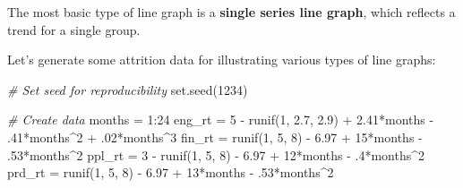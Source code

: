 \documentclass[
]{book}
\newenvironment{Shaded}{\begin{snugshade}}{\end{snugshade}}
\newcommand{\CommentTok}[1]{\textcolor[rgb]{0.56,0.35,0.01}{\textit{#1}}}
\newcommand{\DecValTok}[1]{\textcolor[rgb]{0.00,0.00,0.81}{#1}}
\newcommand{\FloatTok}[1]{\textcolor[rgb]{0.00,0.00,0.81}{#1}}
\newcommand{\FunctionTok}[1]{\textcolor[rgb]{0.00,0.00,0.00}{#1}}
\newcommand{\NormalTok}[1]{#1}
\newcommand{\OtherTok}[1]{\textcolor[rgb]{0.56,0.35,0.01}{#1}}
\newcommand{\SpecialCharTok}[1]{\textcolor[rgb]{0.00,0.00,0.00}{#1}}
\begin{document}
The most basic type of line graph is a \textbf{single series line graph}, which reflects a trend for a single group.

Let's generate some attrition data for illustrating various types of line graphs:

\begin{Shaded}
\begin{Highlighting}[]
\CommentTok{\# Set seed for reproducibility}
\FunctionTok{set.seed}\NormalTok{(}\DecValTok{1234}\NormalTok{)}

\CommentTok{\# Create data}
\NormalTok{months }\OtherTok{=} \DecValTok{1}\SpecialCharTok{:}\DecValTok{24}
\NormalTok{eng\_rt }\OtherTok{=} \DecValTok{5} \SpecialCharTok{{-}} \FunctionTok{runif}\NormalTok{(}\DecValTok{1}\NormalTok{, }\FloatTok{2.7}\NormalTok{, }\FloatTok{2.9}\NormalTok{) }\SpecialCharTok{+} \FloatTok{2.41}\SpecialCharTok{*}\NormalTok{months }\SpecialCharTok{{-}}\NormalTok{ .}\DecValTok{41}\SpecialCharTok{*}\NormalTok{months}\SpecialCharTok{\^{}}\DecValTok{2} \SpecialCharTok{+}\NormalTok{ .}\DecValTok{02}\SpecialCharTok{*}\NormalTok{months}\SpecialCharTok{\^{}}\DecValTok{3}
\NormalTok{fin\_rt }\OtherTok{=} \FunctionTok{runif}\NormalTok{(}\DecValTok{1}\NormalTok{, }\DecValTok{5}\NormalTok{, }\DecValTok{8}\NormalTok{) }\SpecialCharTok{{-}} \FloatTok{6.97} \SpecialCharTok{+} \DecValTok{15}\SpecialCharTok{*}\NormalTok{months }\SpecialCharTok{{-}}\NormalTok{ .}\DecValTok{53}\SpecialCharTok{*}\NormalTok{months}\SpecialCharTok{\^{}}\DecValTok{2}
\NormalTok{ppl\_rt }\OtherTok{=} \DecValTok{3} \SpecialCharTok{{-}} \FunctionTok{runif}\NormalTok{(}\DecValTok{1}\NormalTok{, }\DecValTok{5}\NormalTok{, }\DecValTok{8}\NormalTok{) }\SpecialCharTok{{-}} \FloatTok{6.97} \SpecialCharTok{+} \DecValTok{12}\SpecialCharTok{*}\NormalTok{months }\SpecialCharTok{{-}}\NormalTok{ .}\DecValTok{4}\SpecialCharTok{*}\NormalTok{months}\SpecialCharTok{\^{}}\DecValTok{2}
\NormalTok{prd\_rt }\OtherTok{=} \FunctionTok{runif}\NormalTok{(}\DecValTok{1}\NormalTok{, }\DecValTok{5}\NormalTok{, }\DecValTok{8}\NormalTok{) }\SpecialCharTok{{-}} \FloatTok{6.97} \SpecialCharTok{+} \DecValTok{13}\SpecialCharTok{*}\NormalTok{months }\SpecialCharTok{{-}}\NormalTok{ .}\DecValTok{53}\SpecialCharTok{*}\NormalTok{months}\SpecialCharTok{\^{}}\DecValTok{2}


\end{Highlighting}
\end{Shaded}
\end{document}
